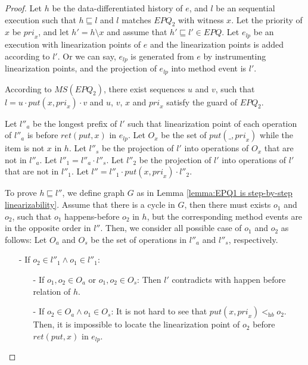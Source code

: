 \begin {proof}

Let $h$ be the data-differentiated history of $e$, and $l$ be an sequential execution such that $h \sqsubseteq l$ and $l$ matches $\textit{EPQ}_2$ with witness $x$. Let the priority of $x$ be $\textit{pri}_x$, and let $h'=h \setminus x$ and assume that $h' \sqsubseteq l' \in \textit{EPQ}$. Let $e_{\textit{lp}}$ be an execution with linearization points of $e$ and the linearization points is added according to $l'$. Or we can say, $e_{\textit{lp}}$ is generated from $e$ by instrumenting linearization points, and the projection of $e_{\textit{lp}}$ into method event is $l'$.

According to $\textit{MS}(\textit{EPQ}_2)$, there exist sequences $u$ and $v$, such that $l=u \cdot \textit{put}(x,\textit{pri}_x) \cdot v$ and $u$, $v$, $x$ and $\textit{pri}_x$ satisfy the guard of $\textit{EPQ}_2$.

Let $l''_a$ be the longest prefix of $l'$ such that linearization point of each operation of $l''_a$ is before $\textit{ret}(\textit{put},x)$ in $e_{\textit{lp}}$. Let $O_x$ be the set of $\textit{put}(\_,\textit{pri}_x)$ while the item is not $x$ in $h$. Let $l''_s$ be the projection of $l'$ into operations of $O_x$ that are not in $l''_a$. Let $l''_1 = l''_a \cdot l''_s$. Let $l''_2$ be the projection of $l'$ into operations of $l'$ that are not in $l''_1$. Let $l'' = l''_1 \cdot \textit{put}(x,\textit{pri}_x) \cdot l''_2$.

To prove $h \sqsubseteq l''$, we define graph $G$ as in Lemma \ref{lemma:EPQ1 is step-by-step linearizability}. Assume that there is a cycle in $G$, then there must exists $o_1$ and $o_2$, such that $o_1$ happens-before $o_2$ in $h$, but the corresponding method events are in the opposite order in $l''$. Then, we consider all possible case of $o_1$ and $o_2$ as follows: Let $O_a$ and $O_s$ be the set of operations in $l''_a$ and $l''_s$, respectively.

\begin{itemize}
\setlength{\itemsep}{0.5pt}
\item[-] If $o_2 \in l''_1 \wedge o_1 \in l''_1$:
    \begin{itemize}
    \setlength{\itemsep}{0.5pt}
    \item[-] If $o_1,o_2 \in O_a$ or $o_1,o_2 \in O_s$: Then $l'$ contradicts with happen before relation of $h$.

    \item[-] If $o_2 \in O_a \wedge o_1 \in O_s$: It is not hard to see that $\textit{put}(x,\textit{pri}_x) <_{\textit{hb}} o_2$. Then, it is impossible to locate the linearization point of $o_2$ before $\textit{ret}(\textit{put},x)$ in $e_{\textit{lp}}$.
    \end{itemize}


\end{itemize}
\end{proof}
